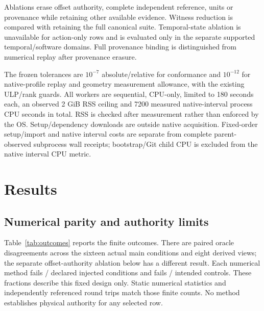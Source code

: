 Ablations erase offset authority, complete independent reference, units or provenance while retaining other available evidence. Witness reduction is compared with retaining the full canonical suite. Temporal-state ablation is unavailable for action-only rows and is evaluated only in the separate supported temporal/software domains. Full provenance binding is distinguished from numerical replay after provenance erasure.

The frozen tolerances are $10^{-7}$ absolute/relative for conformance and $10^{-12}$ for native-profile replay and geometry measurement allowance, with the existing ULP/rank guards. All workers are sequential, CPU-only, limited to 180 seconds each, an observed 2 GiB RSS ceiling and 7200 measured native-interval process CPU seconds in total. RSS is checked after measurement rather than enforced by the OS. Setup/dependency downloads are outside native acquisition. Fixed-order setup/import and native interval costs are separate from complete parent-observed subprocess wall receipts; bootstrap/Git child CPU is excluded from the native interval CPU metric.

\section{Results}
\subsection{Numerical parity and authority limits}
Table~\ref{tab:outcomes} reports the finite outcomes. There are \OracleDisagreements{} paired oracle disagreements across the sixteen actual main conditions and eight derived views; the separate offset-authority ablation below has a different result. Each numerical method fails \CompiledFaultFail{}/\DeclaredFaults{} declared injected conditions and fails \ControlFail{}/\NumericControls{} intended controls. These fractions describe this fixed design only. Static numerical statistics and independently referenced round trips match those finite counts. No method establishes physical authority for any selected row.

\begin{table}[t]
\centering\small

\caption{Selected finite counts for the compiled method; pointwise and strong relational methods have the same counts. Each cell has three injected conditions and one control. Two derived views reuse observations; all six reported physical views per cell remain unknown. PI's OpenPI transport is the same source-artifact group.}
\label{tab:outcomes}
\end{table}

